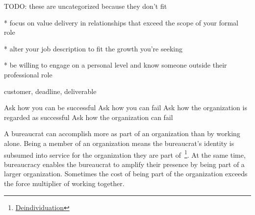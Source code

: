 TODO: these are uncategorized because they don't fit 


* focus on value delivery in relationships that exceed the scope of your formal role

* alter your job description to fit the growth you're seeking

* be willing to engage on a personal level and know someone outside their professional role


customer, deadline, deliverable

Ask how you can be successful
Ask how you can fail
Ask how the organization is regarded as successful
Ask how the organization can fail



A bureaucrat can accomplish more as part of an organization than by working alone. Being a member of an organization means the bureaucrat's identity is subsumed into service for the organization they are part of~\footnote{\href{https://en.wikipedia.org/wiki/Deindividuation}{Deindividuation}}. At the same time, bureaucracy enables the bureaucrat to amplify their presence by being part of a larger organization.  Sometimes the cost of being part of the organization exceeds the force multiplier of working together. 


